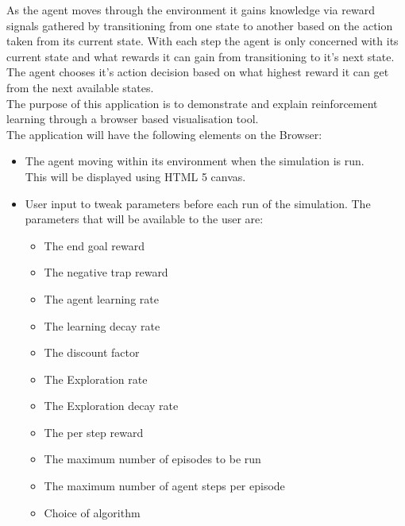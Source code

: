 As the agent moves through the environment it gains knowledge via reward signals gathered by transitioning from one state to another based on the action taken from its current state.
With each step the agent is only concerned with its current state and what rewards it can gain from transitioning to it's next state.~\cite{}
The agent chooses it's action decision based on what highest reward it can get from the next available states.\\
The purpose of this application is to demonstrate and explain reinforcement learning through a browser based visualisation tool.\\
The application will have the following elements on the Browser:
\begin{itemize}
\item The agent moving within its environment when the simulation is run.\\This will be displayed using HTML 5 canvas.

\item User input to tweak parameters before each run of the simulation. The parameters that will be available to the user are:
	\begin{itemize}
		\item The end goal reward
		\item The negative trap reward
		\item The agent learning rate
		\item The learning decay rate
		\item The discount factor
		\item The Exploration rate
		\item The Exploration decay rate
		\item The per step reward
		\item The maximum number of episodes to be run
		\item The maximum number of agent steps per episode
		\item Choice of algorithm
	\end{itemize}
\end{itemize}







